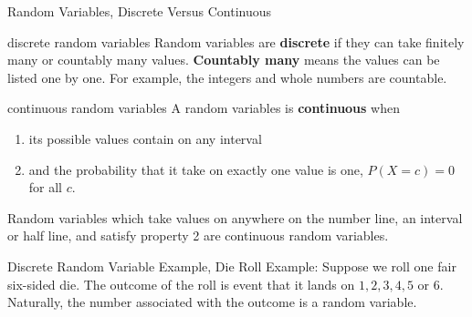 \documentclass[handout]{beamer}
\begin{document}
\begin{frame}{Random Variables, Discrete Versus Continuous}
    \begin{block}{discrete random variables}
        Random variables are \textbf{discrete} if they can take finitely many or countably many values. \textbf{Countably many} means the values can be listed one by one. For example, the integers and whole numbers are countable.
    \end{block}
    \begin{block}{continuous random variables}
        A random variables is \textbf{continuous} when
        \begin{enumerate}
            \item its possible values contain on any interval
            \item and the probability that it take on exactly one value is one, $P(X=c) = 0$ for all $c$.
        \end{enumerate}
        Random variables which take values on anywhere on the number line, an interval or half line, and satisfy property 2 are continuous random variables.
    \end{block}
\end{frame}

\begin{frame}{Discrete Random Variable Example, Die Roll}
    Example: Suppose we roll one fair six-sided die. The outcome of the roll is event that it lands on $1,2,3,4,5$ or $6$. Naturally, the number associated with the outcome is a random variable. 
    \end{frame}

\end{document}
